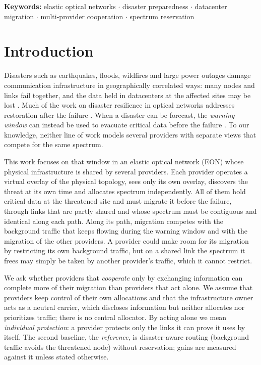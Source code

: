 \documentclass[11pt,a4paper]{article}
\theoremstyle{definition}
\providecommand{\keywords}[1]{\par\medskip\noindent\textbf{Keywords:} #1}
\begin{document}
\keywords{elastic optical networks $\cdot$ disaster preparedness $\cdot$ datacenter migration $\cdot$ multi-provider cooperation $\cdot$ spectrum reservation}

\section{Introduction}

Disasters such as earthquakes, floods, wildfires and large power outages damage communication infrastructure in geographically correlated ways: many nodes and links fail together, and the data held in datacenters at the affected sites may be lost \cite{rak2021disaster}.
Much of the work on disaster resilience in optical networks addresses restoration after the failure \cite{zou2021drama,zou2022dramaplus,zou2025dramapro,sahoo2022cooperation}.
When a disaster can be forecast, the \emph{warning window} can instead be used to evacuate critical data before the failure \cite{evacuation2015rapid,backup2017earlywarning,alertbased2020evacuation,ayoub2021evacuation}.
To our knowledge, neither line of work models several providers with separate views that compete for the same spectrum.

This work focuses on that window in an elastic optical network (EON) whose physical infrastructure is shared by several providers.
Each provider operates a virtual overlay of the physical topology, sees only its own overlay, discovers the threat at its own time and allocates spectrum independently.
All of them hold critical data at the threatened site and must migrate it before the failure, through links that are partly shared and whose spectrum must be contiguous and identical along each path.
Along its path, migration competes with the background traffic that keeps flowing during the warning window and with the migration of the other providers.
A provider could make room for its migration by restricting its own background traffic, but on a shared link the spectrum it frees may simply be taken by another provider's traffic, which it cannot restrict.

We ask whether providers that \emph{cooperate} only by exchanging information can complete more of their migration than providers that act alone.
We assume that providers keep control of their own allocations and that the infrastructure owner acts as a neutral carrier, which discloses information but neither allocates nor prioritizes traffic; there is no central allocator.
By acting alone we mean \emph{individual protection}: a provider protects only the links it can prove it uses by itself.
The second baseline, the \emph{reference}, is disaster-aware routing (background traffic avoids the threatened node) without reservation; gains are measured against it unless stated otherwise.
\end{document}
